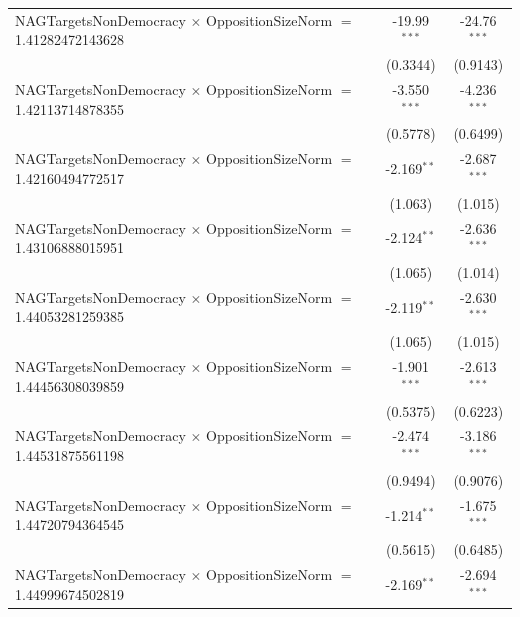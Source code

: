 \begin{tabular}{lcc}
   NAGTargetsNonDemocracy $\times$ OppositionSizeNorm $=$ 1.41282472143628      & -19.99$^{***}$       & -24.76$^{***}$\\   
                                                                                & (0.3344)             & (0.9143)\\   
   NAGTargetsNonDemocracy $\times$ OppositionSizeNorm $=$ 1.42113714878355      & -3.550$^{***}$       & -4.236$^{***}$\\   
                                                                                & (0.5778)             & (0.6499)\\   
   NAGTargetsNonDemocracy $\times$ OppositionSizeNorm $=$ 1.42160494772517      & -2.169$^{**}$        & -2.687$^{***}$\\   
                                                                                & (1.063)              & (1.015)\\   
   NAGTargetsNonDemocracy $\times$ OppositionSizeNorm $=$ 1.43106888015951      & -2.124$^{**}$        & -2.636$^{***}$\\   
                                                                                & (1.065)              & (1.014)\\   
   NAGTargetsNonDemocracy $\times$ OppositionSizeNorm $=$ 1.44053281259385      & -2.119$^{**}$        & -2.630$^{***}$\\   
                                                                                & (1.065)              & (1.015)\\   
   NAGTargetsNonDemocracy $\times$ OppositionSizeNorm $=$ 1.44456308039859      & -1.901$^{***}$       & -2.613$^{***}$\\   
                                                                                & (0.5375)             & (0.6223)\\   
   NAGTargetsNonDemocracy $\times$ OppositionSizeNorm $=$ 1.44531875561198      & -2.474$^{***}$       & -3.186$^{***}$\\   
                                                                                & (0.9494)             & (0.9076)\\   
   NAGTargetsNonDemocracy $\times$ OppositionSizeNorm $=$ 1.44720794364545      & -1.214$^{**}$        & -1.675$^{***}$\\   
                                                                                & (0.5615)             & (0.6485)\\   
   NAGTargetsNonDemocracy $\times$ OppositionSizeNorm $=$ 1.44999674502819      & -2.169$^{**}$        & -2.694$^{***}$\\   

\end{tabular}

